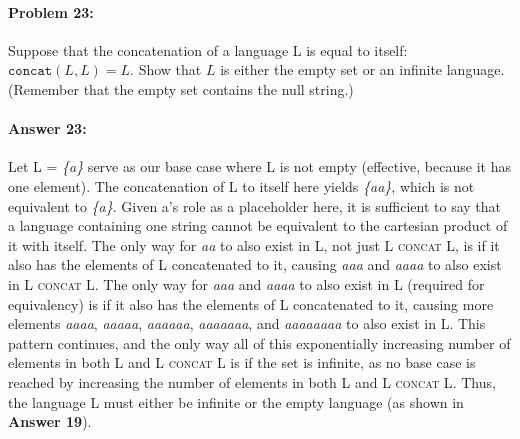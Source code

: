 \documentclass[10pt]{article}
\begin{document}
\hrulefill
\paragraph{Problem 23:}

Suppose that the concatenation of a language L is equal to itself:
$\texttt{concat}(L,L) = L$. Show that $L$ is either the empty set or
an infinite language. (Remember that the empty set contains the null
string.)

\paragraph{Answer 23:} Let L = \textit{\{a\}} serve as our base case where L is not empty (effective, because it has one element). The concatenation of L to itself here yields \textit{\{aa\}}, which is not equivalent to \textit{\{a\}}. Given a's role as a placeholder here, it is sufficient to say that a language containing one string cannot be equivalent to the cartesian product of it with itself. The only way for \textit{aa} to also exist in L, not just \textsc{L concat L}, is if it also has the elements of L concatenated to it, causing \textit{aaa} and \textit{aaaa} to also exist in \textsc{L concat L}. The only way for \textit{aaa} and \textit{aaaa} to also exist in L (required for equivalency) is if it also has the elements of L concatenated to it, causing more elements \textit{aaaa}, \textit{aaaaa}, \textit{aaaaaa}, \textit{aaaaaaa}, and \textit{aaaaaaaa} to also exist in L. This pattern continues, and the only way all of this exponentially increasing number of elements in both L and \textsc{L concat L} is if the set is infinite, as no base case is reached by increasing the number of elements in both L and \textsc{L concat L}. Thus, the language L must either be infinite or the empty language (as shown in \textbf{Answer 19}).
\end{document}
